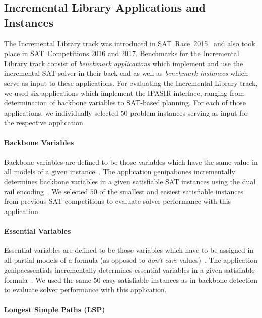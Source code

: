 \documentclass{elsarticle}
\begin{document}
\subsection{Incremental Library Applications and Instances}

The Incremental Library track was introduced in SAT~Race~2015~\cite{Balyo:2015:SATRace} and also took place in SAT~Competitions 2016 and 2017.
Benchmarks for the Incremental Library track consist of \emph{benchmark applications} which implement and use the incremental SAT solver in their back-end as well as \emph{benchmark instances} which serve as input to these applications. 
For evaluating the Incremental Library track, we used six applications which implement the IPASIR interface, ranging from determination of backbone variables to SAT-based planning. 
For each of those applications, we individually selected $50$ problem instances serving as input for the respective application. 

\paragraph{Backbone Variables}

Backbone variables are defined to be those variables which have the same value in all models of a given instance~\cite{Janota:2015:Backbones}. 
The application \textsf{genipabones} incrementally determines backbone variables in a given satisfiable SAT instances using the dual rail encoding~\cite{Balyo:2015:SATRace}.
We selected $50$ of the smallest and easiest satisfiable instances from previous SAT competitions to evaluate solver performance with this application. 

\paragraph{Essential Variables}

Essential variables are defined to be those variables which have to be assigned in all partial models of a formula (as opposed to \emph{don't care}-values)~\cite{Bryant:1987:Essentials}. 
The application \textsf{genipaessentials} incrementally determines essential variables in a given satisfiable formula~\cite{Balyo:2015:SATRace}. 
We used the same $50$ easy satisfiable instances as in backbone detection to evaluate solver performance with this application. 

\paragraph{Longest Simple Paths (LSP)}
\end{document}
